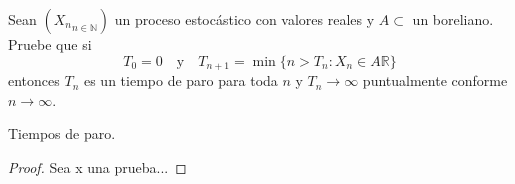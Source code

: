 \begin{problema}
	Sean $\left({X_n}_{n\in\mathbb{N}}\right)$ un proceso estocástico con valores reales y $A\subset$ un boreliano. 
	Pruebe que si
	$$T_0=0\quad\text{y}\quad T_{n+1}=\min\{n>T_n: X_n\in A\mathbb{R}\}$$
	entonces $T_n$ es un tiempo de paro para toda $n$ y $T_n\to \infty$ puntualmente conforme $n\to\infty$. 

	\begin{categoria} 
		Tiempos de paro.
	\end{categoria}
\end{problema}
		
\begin{proof}
	Sea x una prueba...
\end{proof}